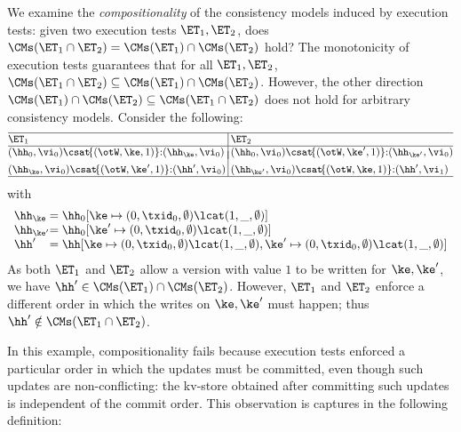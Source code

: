 We examine the \emph{compositionality} of the consistency models induced by execution tests:  
\ie given two execution tests $\ET_1, \ET_2$, does 
$\CMs(\ET_1 \cap \ET_2) = \CMs(\ET_1) \cap \CMs(\ET_2)$ hold? 
The monotonicity of execution tests guarantees that 
 for all $\ET_1, \ET_2$, \( \CMs(\ET_1 \cap \ET_2) \subseteq \CMs(\ET_1) \cap \CMs(\ET_2) \). 
However, the other direction \( \CMs(\ET_1) \cap \CMs(\ET_2) \subseteq \CMs(\ET_1 \cap \ET_2) \) does not hold for arbitrary consistency models.
Consider the following:
\[
\small
\begin{array}{@{}l @{\hspace{2pt}} | @{\hspace{2pt}} l@{}}
    \hline
    \ET_1 & \ET_2 \\
%    
    \hline
    (\hh_{0}, \vi_{0}) \csat\! \{(\otW, \ke, 1)\} {:} ( \hh_{\ke}, \vi_{0})
    &
    (\hh_{0}, \vi_{0}) \csat\! \{(\otW, \ke', 1)\} {:} ( \hh_{\ke'}, \vi_{0}) 
    \vspace*{-7pt}\\\\
    (\hh_{\ke}, \vi_{0}) \csat  \!\{(\otW, \ke', 1)\} {:} (\hh',\vi_{0}) 
    &
    (\hh_{\ke'}, \vi_{0}) \csat \!\{(\otW, \ke, 1)\} {:} (\hh',\vi_{1}) 
    \\
\hline
\end{array}
\]
with 
\[
    \begin{array}{l@{} l}
    \hh_{\ke} & = \hh_{0}[\ke \mapsto (0, \txid_{0}, \emptyset) \lcat (1, \_, \emptyset)] \\
    \hh_{\ke'} & = \hh_{0}[\ke' \mapsto (0, \txid_{0}, \emptyset) \lcat (1, \_, \emptyset)] \\
    \hh' & = \hh[\ke \mapsto (0, \txid_{0}, \emptyset) \lcat (1, \_, \emptyset) 
                ,\ke' \mapsto (0, \txid_{0}, \emptyset) \lcat (1, \_, \emptyset)] \\
\end{array}
\]
As both $\ET_1$ and $\ET_2$ allow a version with value $1$ to be written for 
$\ke, \ke'$,  we have $\hh' \in \CMs(\ET_1) \cap \CMs(\ET_2)$. 
However, $\ET_1$ and $\ET_2$ enforce a different order in which the writes on $\ke, \ke'$ must happen; 
thus $\hh' \notin \CMs(\ET_1 \cap \ET_2)$. 

In this example, compositionality fails because execution tests 
enforced a particular order in which the updates must be committed, even though such updates 
are non-conflicting: the kv-store obtained after committing such updates is independent of the commit order. This observation is captures in the following definition: 

